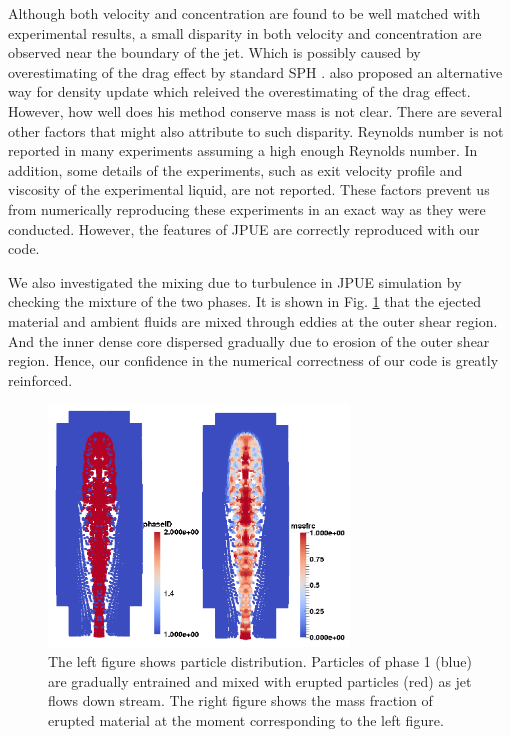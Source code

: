 \documentclass[gmd, manuscript]{copernicus}
\begin{document}
Although both velocity and concentration are found to be well matched with experimental results, a small disparity in both velocity and concentration are observed near the boundary of the jet. Which is possibly caused by overestimating of the drag effect by standard SPH \citep {ritchie2001multiphase}. \citet {ritchie2001multiphase} also proposed an alternative way for density update which releived the overestimating of the drag effect. However, how well does his method conserve mass is not clear. There are several other factors that might also attribute to such disparity. Reynolds number is not reported in many experiments assuming a high enough Reynolds number. In addition, some details of the experiments, such as exit velocity profile and viscosity of the experimental liquid, are not reported. These factors prevent us from numerically reproducing these experiments in an exact way as they were conducted. However, the features of JPUE are correctly reproduced with our code.

We also investigated the mixing due to turbulence in JPUE simulation by checking the mixture of the two phases. It is shown in Fig. \ref{fig:Turb_mixing} that the ejected material and ambient fluids are mixed through eddies at the outer shear region. And the inner dense core dispersed gradually due to erosion of the outer shear region. Hence, our confidence in the numerical correctness of our code is greatly reinforced.

\begin{figure}
\includegraphics[width=8cm]{Fig9.png}
\caption{The left figure shows particle distribution. Particles of phase 1 (blue) are gradually entrained and mixed with erupted particles (red) as jet flows down stream. The right figure shows the mass fraction of erupted material at the moment corresponding to the left figure.}
\label{fig:Turb_mixing}
\end{figure}
\end{document}
